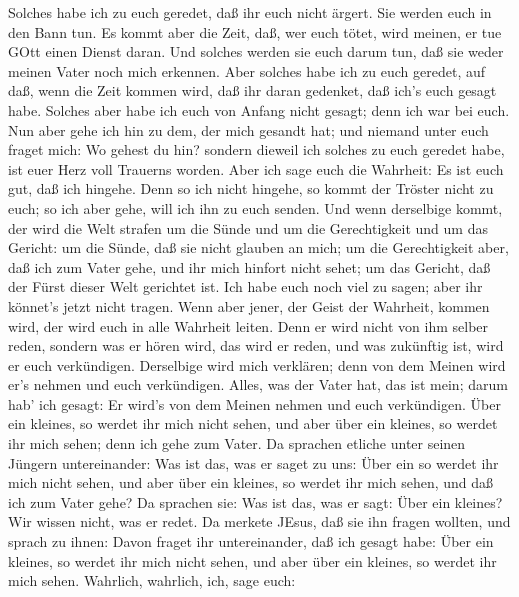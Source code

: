  Solches habe ich zu euch geredet, daß ihr euch nicht
ärgert.  Sie werden euch in den Bann tun. Es kommt aber die
Zeit, daß, wer euch tötet, wird meinen, er tue GOtt einen Dienst daran.
 Und solches werden sie euch darum tun, daß sie weder meinen
Vater noch mich erkennen.  Aber solches habe ich zu euch
geredet, auf daß, wenn die Zeit kommen wird, daß ihr daran gedenket, daß
ich's euch gesagt habe. Solches aber habe ich euch von Anfang nicht
gesagt; denn ich war bei euch.  Nun aber gehe ich hin zu
dem, der mich gesandt hat; und niemand unter euch fraget mich: Wo gehest
du hin?  sondern dieweil ich solches zu euch geredet habe,
ist euer Herz voll Trauerns worden.  Aber ich sage euch die
Wahrheit: Es ist euch gut, daß ich hingehe. Denn so ich nicht hingehe,
so kommt der Tröster nicht zu euch; so ich aber gehe, will ich ihn zu
euch senden.  Und wenn derselbige kommt, der wird die Welt
strafen um die Sünde und um die Gerechtigkeit und um das Gericht:
 um die Sünde, daß sie nicht glauben an mich; 
um die Gerechtigkeit aber, daß ich zum Vater gehe, und ihr mich hinfort
nicht sehet;  um das Gericht, daß der Fürst dieser Welt
gerichtet ist.  Ich habe euch noch viel zu sagen; aber ihr
könnet's jetzt nicht tragen.  Wenn aber jener, der Geist
der Wahrheit, kommen wird, der wird euch in alle Wahrheit leiten. Denn
er wird nicht von ihm selber reden, sondern was er hören wird, das wird
er reden, und was zukünftig ist, wird er euch verkündigen. 
Derselbige wird mich verklären; denn von dem Meinen wird er's nehmen und
euch verkündigen.  Alles, was der Vater hat, das ist mein;
darum hab' ich gesagt: Er wird's von dem Meinen nehmen und euch
verkündigen.  Über ein kleines, so werdet ihr mich nicht
sehen, und aber über ein kleines, so werdet ihr mich sehen; denn ich
gehe zum Vater.  Da sprachen etliche unter seinen Jüngern
untereinander: Was ist das, was er saget zu uns: Über ein so werdet ihr
mich nicht sehen, und aber über ein kleines, so werdet ihr mich sehen,
und daß ich zum Vater gehe?  Da sprachen sie: Was ist das,
was er sagt: Über ein kleines? Wir wissen nicht, was er redet.
 Da merkete JEsus, daß sie ihn fragen wollten, und sprach
zu ihnen: Davon fraget ihr untereinander, daß ich gesagt habe: Über ein
kleines, so werdet ihr mich nicht sehen, und aber über ein kleines, so
werdet ihr mich sehen.  Wahrlich, wahrlich, ich, sage euch:
